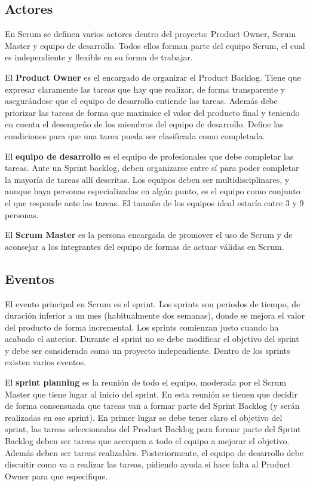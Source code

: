 \documentclass[12pt]{report} %
\begin{document}
\subsection{Actores}
En Scrum se definen varios actores dentro del proyecto: Product Owner, Scrum Master y equipo de desarrollo. Todos ellos forman parte del equipo Scrum, el cual es independiente y flexible en su forma de trabajar.

El \textbf{Product Owner} es el encargado de organizar el Product Backlog. Tiene que expresar claramente las tareas que hay que realizar, de forma transparente y asegurándose que el equipo de desarrollo entiende las tareas. Además debe priorizar las tareas de forma que maximice el valor del producto final y teniendo en cuenta el desempeño de los miembros del equipo de desarrollo. Define las condiciones para que una tarea pueda ser clasificada como completada.

El \textbf{equipo de desarrollo} es el equipo de profesionales que debe completar las tareas. Ante un Sprint backlog, deben organizarse entre sí para poder completar la mayoría de tareas allí descritas. Los equipos deben ser multidisciplinares, y aunque haya personas especializadas en algún punto, es el equipo como conjunto el que responde ante las tareas. El tamaño de los equipos ideal estaría entre 3 y 9 personas.

El \textbf{Scrum Master} es la persona encargada de promover el uso de Scrum y de aconsejar a los integrantes del equipo de formas de actuar válidas en Scrum.

\subsection{Eventos}

El evento principal en Scrum es el sprint. Los sprints son periodos de tiempo, de duración inferior a un mes (habitualmente dos semanas), donde se mejora el valor del producto de forma incremental. Los sprints comienzan justo cuando ha acabado el anterior. Durante el sprint no se debe modificar el objetivo del sprint y debe ser considerado como un proyecto independiente. Dentro de los sprints existen varios eventos.

El \textbf{sprint planning} es la reunión de todo el equipo, moderada por el Scrum Master que tiene lugar al inicio del sprint. En esta reunión se tienen que decidir de forma consensuada que tareas van a formar parte del Sprint Backlog (y serán realizadas en ese sprint). En primer lugar se debe tener claro el objetivo del sprint, las tareas seleccionadas del Product Backlog para formar parte del Sprint Backlog deben ser tareas que acerquen a todo el equipo a mejorar el objetivo. Además deben ser tareas realizables. Posteriormente, el equipo de desarrollo debe discuitir como va a realizar las tareas, pidiendo ayuda si hace falta al Product Owner para que especifique.
\end{document}
